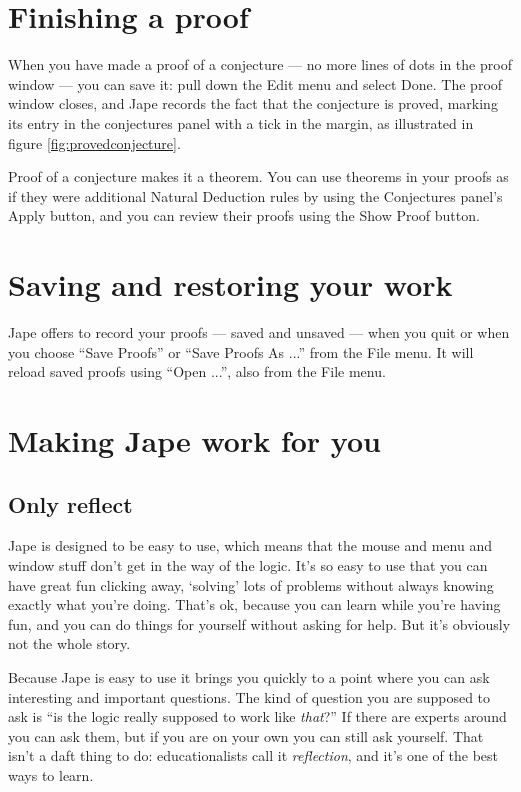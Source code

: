 \documentclass[11pt]{book}
\newcommand{\figref}[1]{figure \ref{fig:#1}}
\begin{document}
\section{Finishing a proof}

When you have made a proof of a conjecture --- no more lines of dots in the proof window --- you can save it: pull down the Edit menu and select Done. The proof window closes, and Jape records the fact that the conjecture is proved, marking its entry in the conjectures panel with a tick in the margin, as illustrated in \figref{provedconjecture}.

Proof of a conjecture makes it a theorem. You can use theorems in your proofs as if they were additional Natural Deduction rules by using the Conjectures panel's Apply button, and you can review 
their proofs using the Show Proof button.

\section{Saving and restoring your work}

Jape offers to record your proofs --- saved and unsaved --- when you quit or when you choose ``Save Proofs'' or ``Save Proofs As ...'' from the File menu. It will reload saved proofs using ``Open ...'', also from the File menu. 

\section{Making Jape work for you}

\subsection{Only reflect}

Jape is designed to be easy to use, which means that the mouse and menu and window stuff don't get in the way of the logic. It's so easy to use that you can have great fun clicking away, `solving' lots of problems without always knowing exactly what you're doing. That's ok, because you can learn while you're having fun, and you can do things for yourself without asking for help. But it's obviously not the whole story.

Because Jape is easy to use it brings you quickly to a point where you can ask interesting and important questions. The kind of question you are supposed to ask is ``is the logic really supposed to work like \emph{that}?'' If there are experts around you can ask them, but if you are on your own you can still ask yourself. That isn't a daft thing to do: educationalists call it \emph{reflection}, and it's one of the best ways to learn.
\end{document}
